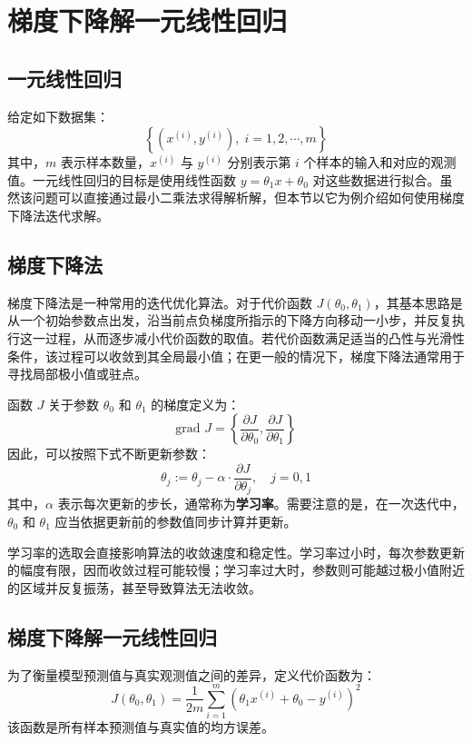 \section{梯度下降解一元线性回归}
\label{sec:chapter1}

\subsection{一元线性回归}

给定如下数据集：
\[
\left\{\left(x^{(i)},y^{(i)}\right),\;i=1,2,\cdots,m\right\}
\]
其中，$m$ 表示样本数量，$x^{(i)}$ 与 $y^{(i)}$ 分别表示第 $i$ 个样本的输入和对应的观测值。一元线性回归的目标是使用线性函数 $y=\theta_1x+\theta_0$ 对这些数据进行拟合。虽然该问题可以直接通过最小二乘法求得解析解，但本节以它为例介绍如何使用梯度下降法迭代求解。


\subsection{梯度下降法}

梯度下降法是一种常用的迭代优化算法。对于代价函数 $J(\theta_0,\theta_1)$，其基本思路是从一个初始参数点出发，沿当前点负梯度所指示的下降方向移动一小步，并反复执行这一过程，从而逐步减小代价函数的取值。若代价函数满足适当的凸性与光滑性条件，该过程可以收敛到其全局最小值；在更一般的情况下，梯度下降法通常用于寻找局部极小值或驻点。

函数 $J$ 关于参数 $\theta_0$ 和 $\theta_1$ 的梯度定义为：
\[
\text{grad }J=\left\{\frac{\partial J}{\partial \theta_0},\frac{\partial J}{\partial \theta_1}\right\}
\]
因此，可以按照下式不断更新参数：
\[
\theta_j:=\theta_j-\alpha\cdot\frac{\partial J}{\partial\theta_j},\quad j=0,1
\]
其中，$\alpha$ 表示每次更新的步长，通常称为\textbf{学习率}。需要注意的是，在一次迭代中，$\theta_0$ 和 $\theta_1$ 应当依据更新前的参数值同步计算并更新。

学习率的选取会直接影响算法的收敛速度和稳定性。学习率过小时，每次参数更新的幅度有限，因而收敛过程可能较慢；学习率过大时，参数则可能越过极小值附近的区域并反复振荡，甚至导致算法无法收敛。


\subsection{梯度下降解一元线性回归}

为了衡量模型预测值与真实观测值之间的差异，定义代价函数为：
\[
J(\theta_0,\theta_1)=\frac{1}{2m}\sum_{i=1}^m\left(\theta_1x^{(i)}+\theta_0-y^{(i)}\right)^2
\]
该函数是所有样本预测值与真实值的均方误差。


